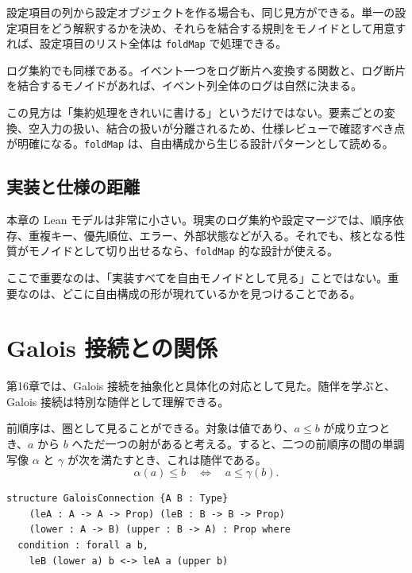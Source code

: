 設定項目の列から設定オブジェクトを作る場合も、同じ見方ができる。単一の設定項目をどう解釈するかを決め、それらを結合する規則をモノイドとして用意すれば、設定項目のリスト全体は \texttt{foldMap} で処理できる。

ログ集約でも同様である。イベント一つをログ断片へ変換する関数と、ログ断片を結合するモノイドがあれば、イベント列全体のログは自然に決まる。

\begin{softwarebox}
この見方は「集約処理をきれいに書ける」というだけではない。要素ごとの変換、空入力の扱い、結合の扱いが分離されるため、仕様レビューで確認すべき点が明確になる。\texttt{foldMap} は、自由構成から生じる設計パターンとして読める。
\end{softwarebox}

\subsection{実装と仕様の距離}

本章の Lean モデルは非常に小さい。現実のログ集約や設定マージでは、順序依存、重複キー、優先順位、エラー、外部状態などが入る。それでも、核となる性質がモノイドとして切り出せるなら、\texttt{foldMap} 的な設計が使える。

ここで重要なのは、「実装すべてを自由モノイドとして見る」ことではない。重要なのは、どこに自由構成の形が現れているかを見つけることである。

\section{Galois 接続との関係}
\label{sec:ch31-galois}

第16章では、Galois 接続を抽象化と具体化の対応として見た。随伴を学ぶと、Galois 接続は特別な随伴として理解できる。

前順序は、圏として見ることができる。対象は値であり、\(a \leq b\) が成り立つとき、\(a\) から \(b\) へただ一つの射があると考える。すると、二つの前順序の間の単調写像 \(\alpha\) と \(\gamma\) が次を満たすとき、これは随伴である。
\[
  \alpha(a) \leq b
  \quad\Longleftrightarrow\quad
  a \leq \gamma(b).
\]


\begin{listing}[htbp]
\begin{verbatim}
structure GaloisConnection {A B : Type}
    (leA : A -> A -> Prop) (leB : B -> B -> Prop)
    (lower : A -> B) (upper : B -> A) : Prop where
  condition : forall a b,
    leB (lower a) b <-> leA a (upper b)
\end{verbatim}
\caption{Galois 接続を命題として表す最小モデル}
\label{lst:ch31_galois}
\end{listing}

